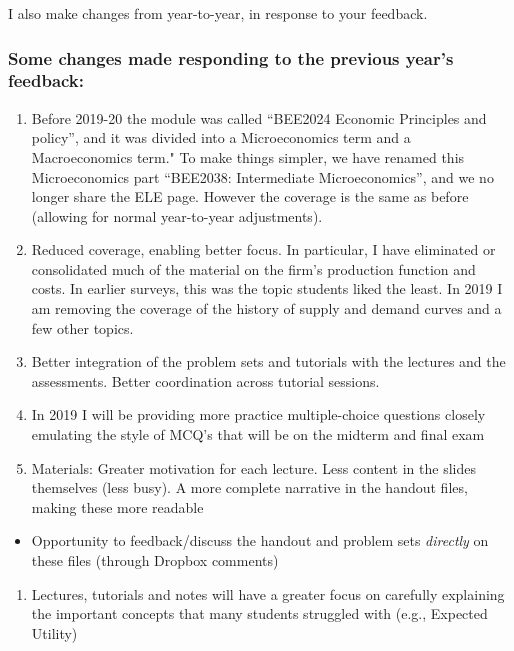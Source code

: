 \documentclass[]{article}
\providecommand{\tightlist}{%
  \setlength{\itemsep}{0pt}\setlength{\parskip}{0pt}}
\begin{document}
I also make changes from year-to-year, in response to your feedback.

\hypertarget{some-changes-made-responding-to-the-previous-years-feedback}{%
\subsubsection{Some changes made responding to the previous year's
feedback:}\label{some-changes-made-responding-to-the-previous-years-feedback}}

\begin{enumerate}
\def\labelenumi{\arabic{enumi}.}
\setcounter{enumi}{-1}
\item
  Before 2019-20 the module was called ``BEE2024 Economic Principles and
  policy'', and it was divided into a Microeconomics term and a
  Macroeconomics term." To make things simpler, we have renamed this
  Microeconomics part ``BEE2038: Intermediate Microeconomics'', and we
  no longer share the ELE page. However the coverage is the same as
  before (allowing for normal year-to-year adjustments).
\item
  Reduced coverage, enabling better focus. In particular, I have
  eliminated or consolidated much of the material on the firm's
  production function and costs. In earlier surveys, this was the topic
  students liked the least. In 2019 I am removing the coverage of the
  history of supply and demand curves and a few other topics.
\item
  Better integration of the problem sets and tutorials with the lectures
  and the assessments. Better coordination across tutorial sessions.
\item
  In 2019 I will be providing more practice multiple-choice questions
  closely emulating the style of MCQ's that will be on the midterm and
  final exam
\item
  Materials: Greater motivation for each lecture. Less content in the
  slides themselves (less busy). A more complete narrative in the
  handout files, making these more readable
\end{enumerate}

\begin{itemize}
\tightlist
\item
  Opportunity to feedback/discuss the handout and problem sets
  \emph{directly} on these files (through Dropbox comments)
\end{itemize}

\begin{enumerate}
\def\labelenumi{\arabic{enumi}.}
\setcounter{enumi}{4}
\tightlist
\item
  Lectures, tutorials and notes will have a greater focus on carefully
  explaining the important concepts that many students struggled with
  (e.g., Expected Utility)
\end{enumerate}
\end{document}
